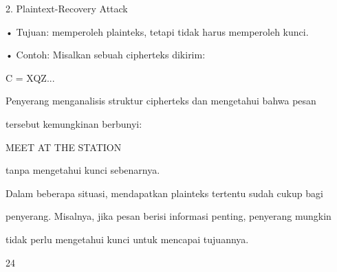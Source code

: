 \documentclass{article}
\begin{document}

2. Plaintext-Recovery Attack

• Tujuan: memperoleh plainteks, tetapi tidak harus memperoleh kunci.

• Contoh: Misalkan sebuah cipherteks dikirim:

              C = XQZ...

   Penyerang menganalisis struktur cipherteks dan mengetahui bahwa pesan 

tersebut kemungkinan berbunyi:

              MEET AT THE STATION

   tanpa mengetahui kunci sebenarnya.

Dalam beberapa situasi, mendapatkan plainteks tertentu sudah cukup bagi 

penyerang. Misalnya, jika pesan berisi informasi penting, penyerang mungkin 

tidak perlu mengetahui kunci untuk mencapai tujuannya.

24
\end{document}
